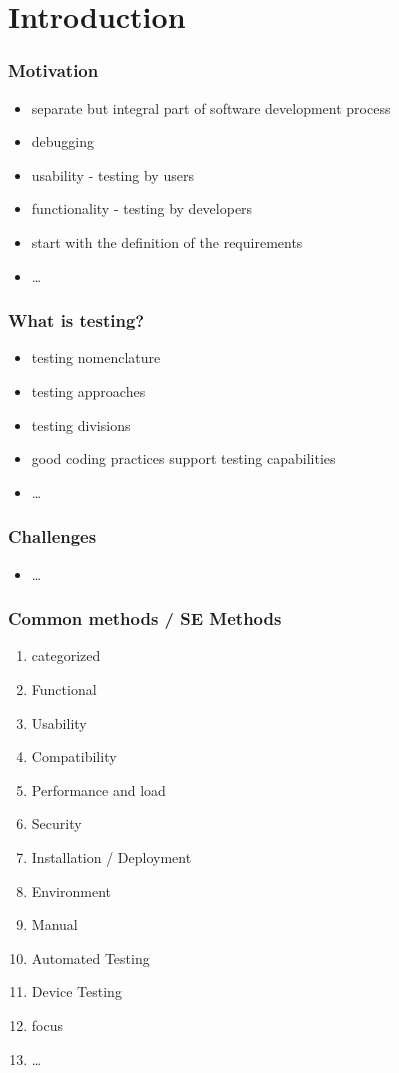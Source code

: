 
\section{Introduction}

\begin{frame}[fragile]
\frametitle{Motivation}
\begin{itemize}
\item separate but integral part of software development process
\item debugging
\item usability - testing by users
\item functionality - testing by developers
\item start with the definition of the requirements
\item \ldots
\end{itemize}
\end{frame}

\begin{frame}[fragile]
\frametitle{What is testing?}
\begin{itemize}
\item testing nomenclature
\item testing approaches
\item testing divisions
\item good coding practices support testing capabilities
\item \ldots
\end{itemize}
\end{frame}

\begin{frame}[fragile]
\frametitle{Challenges}
\begin{itemize}
\item \ldots
\end{itemize}
\end{frame}

\begin{frame}[fragile]
\frametitle{Common methods / SE Methods}
\begin{enumerate}
\item categorized 
\item Functional
\item Usability
\item Compatibility
\item Performance and load
\item Security
\item Installation / Deployment
\item Environment
\item Manual 
\item Automated Testing
\item Device Testing
\item focus
\item \ldots
\end{enumerate}
\end{frame}

